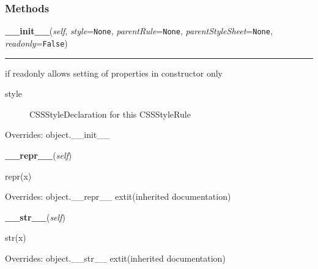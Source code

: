   \subsubsection{Methods}

    \vspace{0.5ex}

\hspace{.8\funcindent}\begin{boxedminipage}{\funcwidth}

    \raggedright \textbf{\_\_init\_\_}(\textit{self}, \textit{style}={\tt None}, \textit{parentRule}={\tt None}, \textit{parentStyleSheet}={\tt None}, \textit{readonly}={\tt False})

    \vspace{-1.5ex}

    \rule{\textwidth}{0.5\fboxrule}
\setlength{\parskip}{2ex}

if readonly allows setting of properties in constructor only
\begin{description}
\item[{style}] \leavevmode 
CSSStyleDeclaration for this CSSStyleRule

\end{description}
\setlength{\parskip}{1ex}
      Overrides: object.\_\_init\_\_

    \end{boxedminipage}

    \vspace{0.5ex}

\hspace{.8\funcindent}\begin{boxedminipage}{\funcwidth}

    \raggedright \textbf{\_\_repr\_\_}(\textit{self})

\setlength{\parskip}{2ex}
    repr(x)

\setlength{\parskip}{1ex}
      Overrides: object.\_\_repr\_\_ 	extit{(inherited documentation)}

    \end{boxedminipage}

    \vspace{0.5ex}

\hspace{.8\funcindent}\begin{boxedminipage}{\funcwidth}

    \raggedright \textbf{\_\_str\_\_}(\textit{self})

\setlength{\parskip}{2ex}
    str(x)

\setlength{\parskip}{1ex}
      Overrides: object.\_\_str\_\_ 	extit{(inherited documentation)}

    \end{boxedminipage}


